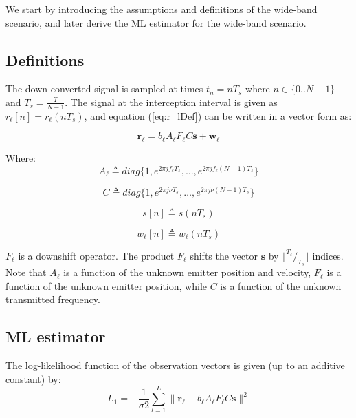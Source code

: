 \documentclass[10pt,a4paper]{report}
\begin{document}
We start by introducing the assumptions and definitions of the wide-band scenario, and later derive the ML estimator for the wide-band scenario.

\subsection{Definitions}
The down converted signal is sampled at times $t_n=nT_s$ where $n\in\{0..N-1\}$ and $T_s =\frac{T}{N-1}$.
The signal at the interception interval is given as $r_\ell [n]=r_\ell (nT_s)$, and equation (\ref{eq:r_lDef}) can be written in a vector form as:

\begin{equation}
\label{eq:r_lWBDef}
\mathbf{r_\ell}=b_\ell A_\ell F_\ell C \mathbf{s} + \mathbf{w_\ell}
\end{equation}

Where:
\begin{equation}
A_\ell \triangleq diag\{1,e^{2 \pi j f_\ell  T_s},\dots,e^{2 \pi j f_\ell (N-1) T_s} \}                                                         
\end{equation}

\begin{equation}
C \triangleq diag \{1  ,e^{2 \pi j \nu T_s},\dots,e^{2 \pi j \nu (N-1) T_s }\}                                                         
\end{equation}

\begin{equation}
s[n] \triangleq s(nT_s)                                                                                                           
\end{equation}

\begin{equation}
w_\ell[n] \triangleq w_\ell(nT_s)                                                                                                        
\end{equation}

$F_\ell$ is a downshift operator. The product $F_\ell$ shifts the vector $\mathbf{s}$ by $\lfloor ^{T_\ell}/_{T_s} \rfloor$ indices.
Note that $A_\ell$ is a function of the unknown emitter position and velocity, $F_\ell$ is a function of the unknown emitter position, while $C$ is a function of the unknown transmitted frequency.
 
\subsection{ML estimator}
The log-likelihood function of the observation vectors is given (up to an additive constant) by:
\begin{equation}
\label{eq:L_1WBdef}
L_1 = -\frac{1}{\sigma{2}} \sum_{l=1}^{L} \|\mathbf{r_\ell} - b_\ell A_\ell F_\ell C \mathbf{s}\|^2                                                             
\end{equation}
\end{document}
